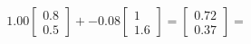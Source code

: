 \documentclass[preview]{standalone}
\begin{document}
\begin{align*}
1.00 \begin{bmatrix} 0.8 \\ 0.5 \end{bmatrix} + -0.08 \begin{bmatrix} 1 \\ 1.6 \end{bmatrix} = \begin{bmatrix} 0.72 \\ 0.37 \end{bmatrix} =
\end{align*}
\end{document}
